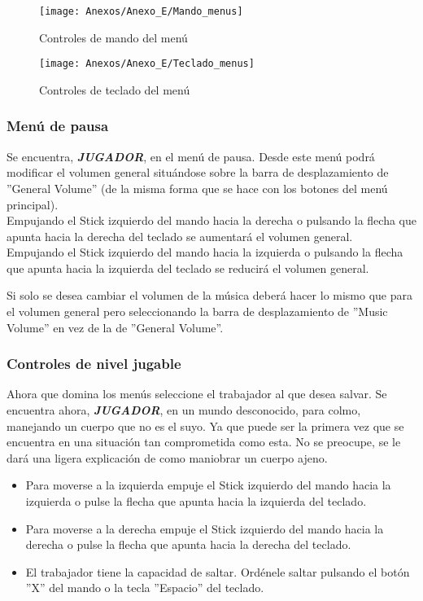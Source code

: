 \begin{figure}[h]
\centering
\texttt{[image: Anexos/Anexo\_E/Mando\_menus]}
\caption{Controles de mando del menú}
\end{figure}

\begin{figure}[h]
\centering
\texttt{[image: Anexos/Anexo\_E/Teclado\_menus]}
\caption{Controles de teclado del menú}
\end{figure}

\subsubsection{Menú de pausa}
Se encuentra, \textit{\textbf{JUGADOR}}, en el menú de pausa. Desde este menú podrá modificar el volumen general situándose sobre la barra de desplazamiento de ''General Volume'' (de la misma forma que se hace con los botones del menú principal).\\
Empujando el Stick izquierdo del mando hacia la derecha o pulsando la flecha que apunta hacia la derecha del teclado se aumentará el volumen general.\\
Empujando el Stick izquierdo del mando hacia la izquierda o pulsando la flecha que apunta hacia la izquierda del teclado se reducirá el volumen general.

Si solo se desea cambiar el volumen de la música deberá hacer lo mismo que para el volumen general pero seleccionando la barra de desplazamiento de ''Music Volume'' en vez de la de ''General Volume''.

\subsubsection{Controles de nivel jugable}
Ahora que domina los menús seleccione el \textcolor{azulWorker}{trabajador} al que desea salvar. Se encuentra ahora, \textit{\textbf{JUGADOR}}, en un \textcolor{endeavour}{mundo desconocido}, para colmo, manejando un cuerpo que no es el suyo. Ya que puede ser la primera vez que se encuentra en una situación tan comprometida como esta. No se preocupe, se le dará una ligera explicación de como maniobrar un cuerpo ajeno.
\begin{itemize}
\item
Para moverse a la izquierda empuje el Stick izquierdo del mando hacia la izquierda o pulse la flecha que apunta hacia la izquierda del teclado.
\item
Para moverse a la derecha empuje el Stick izquierdo del mando hacia la derecha o pulse la flecha que apunta hacia la derecha del teclado.
\item
El \textcolor{azulWorker}{trabajador} tiene la capacidad de saltar. Ordénele saltar pulsando el botón ''X'' del mando o la tecla ''Espacio'' del teclado.
\end{itemize}


